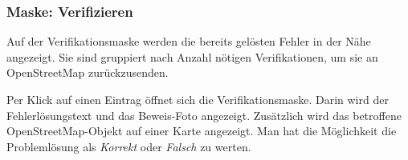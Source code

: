\begin{figure}[H]
\hfill
{}
\end{figure}

\subsubsection{Maske: Verifizieren}
Auf der Verifikationsmaske werden die bereits gelösten Fehler in der Nähe angezeigt.
Sie sind gruppiert nach Anzahl nötigen Verifikationen, um sie an \gls{OpenStreetMap} zurückzusenden.

Per Klick auf einen Eintrag öffnet sich die Verifikationsmaske.
Darin wird der Fehlerlösungstext und das Beweis-Foto angezeigt.
Zusätzlich wird das betroffene \gls{OpenStreetMap}-Objekt auf einer Karte angezeigt.
Man hat die Möglichkeit die Problemlösung als \emph{Korrekt} oder \emph{Falsch} zu werten.

